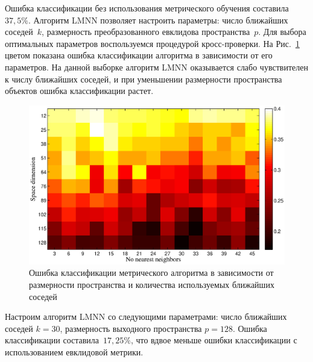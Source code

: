 	Ошибка классификации без использования метрического обучения составила~$37,5\%$.
	Алгоритм LMNN позволяет настроить параметры: число ближайших соседей~$k$,
	размерность преобразованного евклидова пространства~$p$.
	Для выбора оптимальных параметров воспользуемся процедурой кросс-проверки.
	На Рис.~\ref{heat_map} цветом показана ошибка классификации алгоритма в зависимости от его параметров.
	На данной выборке алгоритм LMNN оказывается слабо чувствителен к числу ближайших соседей,
	и при уменьшении размерности пространства объектов ошибка классификации растет.
	\begin{figure}[ht]
		\centering
		\includegraphics[width=1\linewidth]{figs/ch4/heat_map}
		\caption{Ошибка классификации метрического алгоритма в зависимости от размерности пространства и количества используемых ближайших соседей}
		\label{heat_map}
	\end{figure}
	
	Настроим алгоритм LMNN со следующими параметрами: число ближайших соседей $k = 30$, размерность
	выходного пространства $p = 128$.
	Ошибка классификации составила~$17,25\%$, что вдвое меньше ошибки классификации с использованием евклидовой метрики.
	
